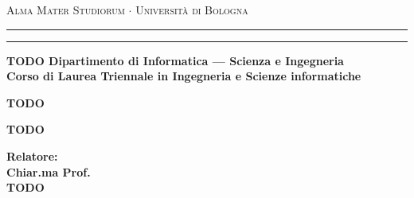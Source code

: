 \documentclass[12pt,a4paper,openright,twoside]{report}
\begin{document}
	\begin{titlepage}
		\begin{center}
			
			{{\Large{\textsc{Alma Mater Studiorum $\cdot$ Universit\`a di
							Bologna}}}} \rule[0.1cm]{15.8cm}{0.1mm}
			\rule[0.5cm]{15.8cm}{0.6mm}
			
			{\small{\bf TODO Dipartimento di Informatica --- Scienza e Ingegneria\\
					Corso di Laurea Triennale in Ingegneria e Scienze informatiche}}
		\end{center}
		
		\vspace{15mm}
		\begin{center}
			{\LARGE{\bf TODO}}\\
			\vspace{3mm}
			
			\vspace{19mm}
			{\large{\bf TODO}}
		\end{center}
		
		\vspace{30mm}
		\par
		\noindent
		\begin{minipage}[t]{0.50\textwidth}
			{\large{\bf Relatore:\\
					Chiar.ma Prof.\\
					TODO}} \\[5mm]
			

\end{minipage}
\end{titlepage}
\end{document}
